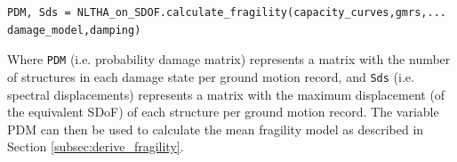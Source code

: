\begin{Verbatim}[frame=single, commandchars=\\\{\}, samepage=true]
PDM, Sds = NLTHA_on_SDOF.calculate_fragility(capacity_curves,gmrs,...
damage_model,damping)
\end{Verbatim}

Where \verb=PDM= (i.e. probability damage matrix) represents a matrix with the number of structures in each damage state per ground motion record, and \verb=Sds= (i.e. spectral displacements) represents a matrix with the maximum displacement (of the equivalent SDoF) of each structure per ground motion record. The variable PDM can then be used to calculate the mean fragility model as described in Section \ref{subsec:derive_fragility}.